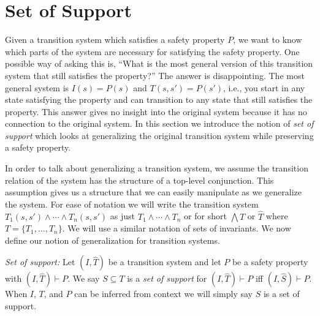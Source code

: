 \section{Set of Support}
\label{sec:support}

\newcommand{\bq}{\textsc{BaseQuery}\xspace}
\newcommand{\iq}{\textsc{InductiveQuery}\xspace}
\newcommand{\fq}{\textsc{FullQuery}\xspace}

\newcommand{\mink}{\textsc{MinimizeK}\xspace}
\newcommand{\reduceinv}{\textsc{ReduceInvariants}\xspace}
\newcommand{\minsupport}{\textsc{MinimizeSupport}\xspace}

\newcommand{\checksat}{\textsc{CheckSat}\xspace}
\newcommand{\unsatcore}{\textsc{UnsatCore}\xspace}
\newcommand{\unsat}{\textsc{UNSAT}\xspace}
\newcommand{\sat}{\textsc{SAT}\xspace}

Given a transition system which satisfies a safety property $P$, we
want to know which parts of the system are necessary for satisfying
the safety property. One possible way of asking this is, ``What is the
most general version of this transition system that still satisfies
the property?'' The answer is disappointing. The most general system is
$I(s) = P(s)$ and $T(s, s') = P(s')$, i.e., you start in any state
satisfying the property and can transition to any state that still
satisfies the property. This answer gives no insight into the original
system because it has no connection to the original system. In this
section we introduce the notion of {\em set of support} which looks at
generalizing the original transition system while preserving a safety
property.

In order to talk about generalizing a transition system, we assume the
transition relation of the system has the structure of a top-level
conjunction. This assumption gives us a structure that we can easily
manipulate as we generalize the system. For ease of notation we will
write the transition system $T_1(s, s') \land \cdots \land T_n(s, s')$
as just $T_1 \land \cdots \land T_n$ or for short $\bigwedge T$ or
$\widehat T$ where $T = \{T_1, \ldots, T_n\}$. We will use a similar
notation of sets of invariants. We now define our notion of
generalization for transition systems.

\begin{definition}{\emph{Set of support:}}
  \label{def:set-of-support}
  Let $(I, \widehat T)$ be a transition system and let $P$ be a
  safety property with $(I, \widehat T)\vdash P$. We say $S \subseteq
  T$ is a {\em set of support} for $(I, \widehat T)\vdash P$ iff $(I,
  \widehat S) \vdash P$. When $I$, $T$, and $P$ can be inferred from
  context we will simply say $S$ is a set of support.
\end{definition}

